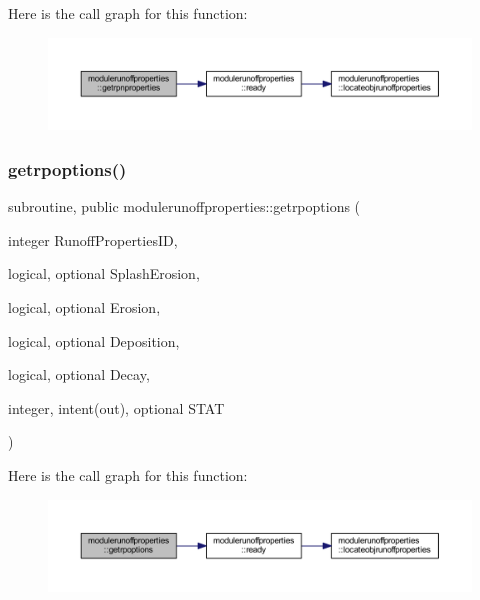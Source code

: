 Here is the call graph for this function\+:\nopagebreak
\begin{figure}[H]
\begin{center}
\leavevmode
\includegraphics[width=350pt]{namespacemodulerunoffproperties_a4e8dd453019d74193b19d83465d41e85_cgraph}
\end{center}
\end{figure}
\mbox{\label{namespacemodulerunoffproperties_ad5669badf377e3cc3ab36dd0f775f5fa}} 
\subsubsection{\texorpdfstring{getrpoptions()}{getrpoptions()}}
{\footnotesize\ttfamily subroutine, public modulerunoffproperties\+::getrpoptions (\begin{DoxyParamCaption}\item[{integer}]{Runoff\+Properties\+ID,  }\item[{logical, optional}]{Splash\+Erosion,  }\item[{logical, optional}]{Erosion,  }\item[{logical, optional}]{Deposition,  }\item[{logical, optional}]{Decay,  }\item[{integer, intent(out), optional}]{S\+T\+AT }\end{DoxyParamCaption})}

Here is the call graph for this function\+:\nopagebreak
\begin{figure}[H]
\begin{center}
\leavevmode
\includegraphics[width=350pt]{namespacemodulerunoffproperties_ad5669badf377e3cc3ab36dd0f775f5fa_cgraph}
\end{center}
\end{figure}
\mbox{\label{namespacemodulerunoffproperties_a99e35b0a7f1f65083cde0db46427a9df}} 
